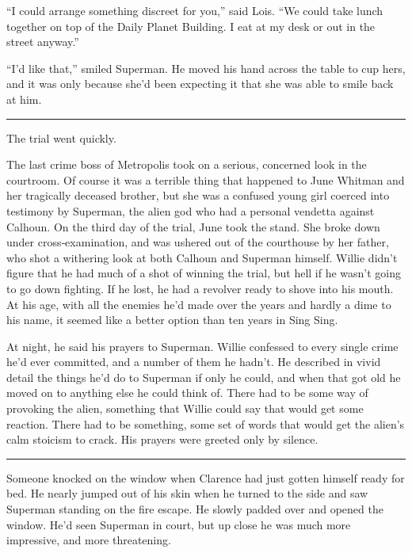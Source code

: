 \documentclass[ebook,12pt]{memoir}
\begin{document}
``I could arrange something discreet for you,'' said Lois. ``We could
take lunch together on top of the Daily Planet Building. I eat at my
desk or out in the street anyway.''

``I'd like that,'' smiled Superman. He moved his hand across the table
to cup hers, and it was only because she'd been expecting it that she
was able to smile back at him.

\begin{center}\rule{0.5\linewidth}{0.5pt}\end{center}

The trial went quickly.

The last crime boss of Metropolis took on a serious, concerned look in
the courtroom. Of course it was a terrible thing that happened to June
Whitman and her tragically deceased brother, but she was a confused
young girl coerced into testimony by Superman, the alien god who had a
personal vendetta against Calhoun. On the third day of the trial, June
took the stand. She broke down under cross‐examination, and was ushered
out of the courthouse by her father, who shot a withering look at both
Calhoun and Superman himself. Willie didn't figure that he had much of a
shot of winning the trial, but hell if he wasn't going to go down
fighting. If he lost, he had a revolver ready to shove into his mouth.
At his age, with all the enemies he'd made over the years and hardly a
dime to his name, it seemed like a better option than ten years in Sing
Sing.

At night, he said his prayers to Superman. Willie confessed to every
single crime he'd ever committed, and a number of them he hadn't. He
described in vivid detail the things he'd do to Superman if only he
could, and when that got old he moved on to anything else he could think
of. There had to be some way of provoking the alien, something that
Willie could say that would get some reaction. There had to be
something, some set of words that would get the alien's calm stoicism to
crack. His prayers were greeted only by silence.

\begin{center}\rule{0.5\linewidth}{0.5pt}\end{center}

Someone knocked on the window when Clarence had just gotten himself
ready for bed. He nearly jumped out of his skin when he turned to the
side and saw Superman standing on the fire escape. He slowly padded over
and opened the window. He'd seen Superman in court, but up close he was
much more impressive, and more threatening.
\end{document}
